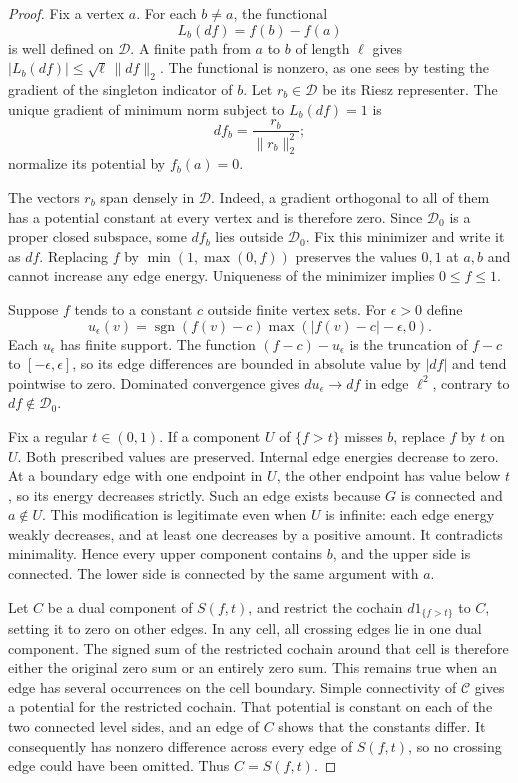 \begin{proof}
Fix a vertex $a$.  For each $b\ne a$, the functional
\[
 L_b(df)=f(b)-f(a)
\]
is well defined on $\mathcal D$.  A finite path from $a$ to $b$ of length
$\ell$ gives $|L_b(df)|\le\sqrt{\ell}\,\|df\|_2$.  The functional is
nonzero, as one sees by testing the gradient of the singleton indicator
of $b$.  Let $r_b\in\mathcal D$ be its Riesz representer.  The unique
gradient of minimum norm subject to $L_b(df)=1$ is
\[
 df_b=\frac{r_b}{\|r_b\|_2^2};
\]
normalize its potential by $f_b(a)=0$.

The vectors $r_b$ span densely in $\mathcal D$.  Indeed, a gradient
orthogonal to all of them has a potential constant at every vertex and
is therefore zero.  Since $\mathcal D_0$ is a proper closed subspace,
some $df_b$ lies outside $\mathcal D_0$.  Fix this minimizer and write it
as $df$.  Replacing $f$ by $\min(1,\max(0,f))$ preserves the values $0,1$
at $a,b$ and cannot increase any edge energy.  Uniqueness of the
minimizer implies $0\le f\le1$.

Suppose $f$ tends to a constant $c$ outside finite vertex sets.  For
$\epsilon>0$ define
\[
 u_\epsilon(v)=\operatorname{sgn}(f(v)-c)
                      \max(|f(v)-c|-\epsilon,0).
\]
Each $u_\epsilon$ has finite support.  The function
$(f-c)-u_\epsilon$ is the truncation of $f-c$ to
$[-\epsilon,\epsilon]$, so its edge differences are bounded in absolute
value by $|df|$ and tend pointwise to zero.  Dominated convergence gives
$du_\epsilon\to df$ in edge $\ell^2$, contrary to
$df\notin\mathcal D_0$.

Fix a regular $t\in(0,1)$.  If a component $U$ of $\{f>t\}$ misses $b$,
replace $f$ by $t$ on $U$.  Both prescribed values are preserved.
Internal edge energies decrease to zero.  At a boundary edge with one
endpoint in $U$, the other endpoint has value below $t$, so its energy
decreases strictly.  Such an edge exists because $G$ is connected and
$a\notin U$.  This modification is legitimate even when $U$ is
infinite: each edge energy weakly decreases, and at least one decreases
by a positive amount.  It contradicts minimality.  Hence every upper
component contains $b$, and the upper side is connected.  The lower
side is connected by the same argument with $a$.

Let $C$ be a dual component of $S(f,t)$, and restrict the cochain
$d1_{\{f>t\}}$ to $C$, setting it to zero on other edges.  In any cell,
all crossing edges lie in one dual component.  The signed sum of the
restricted cochain around that cell is therefore either the original
zero sum or an entirely zero sum.  This remains true when an edge has
several occurrences on the cell boundary.  Simple connectivity of
$\mathcal C$ gives a potential for the restricted cochain.  That
potential is constant on each of the two connected level sides, and
an edge of $C$ shows that the constants differ.  It consequently has
nonzero difference across every edge of $S(f,t)$, so no crossing edge
could have been omitted.  Thus $C=S(f,t)$.
\end{proof}

